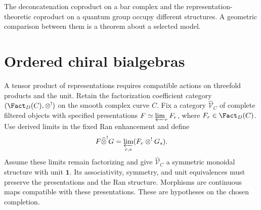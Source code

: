 The deconcatenation coproduct on a bar complex and the representation-theoretic coproduct on a quantum group occupy different structures. A geometric comparison between them is a theorem about a selected model.

\chapter{Ordered chiral bialgebras}
A tensor product of representations requires compatible actions on
threefold products and the unit.
Retain the factorization coefficient category
$(\Fact_D(C),\tensor^!)$ on the smooth complex curve $C$.
Fix a category $\widehat{\mathcal V}_C$ of complete filtered objects
with specified presentations $F\simeq\varprojlim_r F_r$,
where $F_r\in\Fact_D(C)$.
Use derived limits in the fixed Ran enhancement and define
\[
 F\widehat{\mathbin{\otimes}}^{!}G
 =\varprojlim_{r,s}(F_r\mathbin{\otimes}^!G_s).
\]
Assume these limits remain factorizing and give
$\widehat{\mathcal V}_C$ a symmetric monoidal structure with unit $\mathbf1$.
Its associativity, symmetry, and unit equivalences must preserve
the presentations and the Ran structure.
Morphisms are continuous maps compatible with these presentations.
These are hypotheses on the chosen completion.

